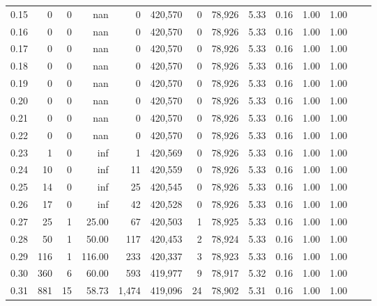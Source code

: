 \begin{tabular}{rrrrrrrrrrrrrr}
0.15 &       0 &      0 &     nan &        0 &  420,570 &       0 &  78,926 &  5.33 &  0.16 &  1.00 &      1.00 \\
0.16 &       0 &      0 &     nan &        0 &  420,570 &       0 &  78,926 &  5.33 &  0.16 &  1.00 &      1.00 \\
0.17 &       0 &      0 &     nan &        0 &  420,570 &       0 &  78,926 &  5.33 &  0.16 &  1.00 &      1.00 \\
0.18 &       0 &      0 &     nan &        0 &  420,570 &       0 &  78,926 &  5.33 &  0.16 &  1.00 &      1.00 \\
0.19 &       0 &      0 &     nan &        0 &  420,570 &       0 &  78,926 &  5.33 &  0.16 &  1.00 &      1.00 \\
0.20 &       0 &      0 &     nan &        0 &  420,570 &       0 &  78,926 &  5.33 &  0.16 &  1.00 &      1.00 \\
0.21 &       0 &      0 &     nan &        0 &  420,570 &       0 &  78,926 &  5.33 &  0.16 &  1.00 &      1.00 \\
0.22 &       0 &      0 &     nan &        0 &  420,570 &       0 &  78,926 &  5.33 &  0.16 &  1.00 &      1.00 \\
0.23 &       1 &      0 &     inf &        1 &  420,569 &       0 &  78,926 &  5.33 &  0.16 &  1.00 &      1.00 \\
0.24 &      10 &      0 &     inf &       11 &  420,559 &       0 &  78,926 &  5.33 &  0.16 &  1.00 &      1.00 \\
0.25 &      14 &      0 &     inf &       25 &  420,545 &       0 &  78,926 &  5.33 &  0.16 &  1.00 &      1.00 \\
0.26 &      17 &      0 &     inf &       42 &  420,528 &       0 &  78,926 &  5.33 &  0.16 &  1.00 &      1.00 \\
0.27 &      25 &      1 &   25.00 &       67 &  420,503 &       1 &  78,925 &  5.33 &  0.16 &  1.00 &      1.00 \\
0.28 &      50 &      1 &   50.00 &      117 &  420,453 &       2 &  78,924 &  5.33 &  0.16 &  1.00 &      1.00 \\
0.29 &     116 &      1 &  116.00 &      233 &  420,337 &       3 &  78,923 &  5.33 &  0.16 &  1.00 &      1.00 \\
0.30 &     360 &      6 &   60.00 &      593 &  419,977 &       9 &  78,917 &  5.32 &  0.16 &  1.00 &      1.00 \\
0.31 &     881 &     15 &   58.73 &    1,474 &  419,096 &      24 &  78,902 &  5.31 &  0.16 &  1.00 &      1.00 \\

\end{tabular}
